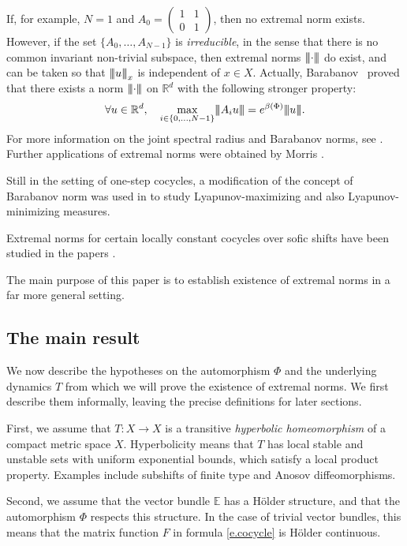 \documentclass[10pt]{amsart}
\theoremstyle{plain}
\theoremstyle{definition}
\newcommand{\tribar}[1]{\mathopen{| {\kern -1.5pt} | {\kern -1.5pt} |} {#1}
\mathclose{| {\kern -1.5pt} | {\kern -1.5pt} |}}
\newcommand{\RR}{\mathbb{R}}
\newcommand{\EE}{\mathbb{E}}
\begin{document}
If, for example, $N=1$ and $A_0 = \left( \begin{smallmatrix} 1 & 1 \\ 0 & 1 \end{smallmatrix} \right)$, then no extremal norm exists. However, if the set $\{A_0,\dots,A_{N-1}\}$ is \emph{irreducible}, in the sense that there is no common invariant non-trivial subspace, then extremal norms $\tribar{\cdot}$ do exist, and can be taken so that
$\tribar{u}_x$ is independent of $x \in X$.
Actually, Barabanov~\cite{Barabanov} proved that there exists a norm $\tribar{\cdot}$ on $\RR^d$ with the following stronger property:
\begin{equation}\label{e.Barabanov}
\forall u \in \RR^d, \quad
\max_{i \in \{0,\dots,N-1\}} \tribar{A_i u} = e^{\beta(\Phi)} \tribar{u}.
\end{equation}
For more information on the joint spectral radius and Barabanov norms, see \cite{Wirth,Jungers}.
Further applications of extremal norms were obtained by Morris \cite{Morris_rapidly,Morris_Mather}.

Still in the setting of one-step cocycles, a modification of the concept of Barabanov norm was used in \cite{BR,BM} to study Lyapunov-maximizing and also Lyapunov-minimizing measures.

Extremal norms for certain locally constant cocycles over sofic shifts have been studied in the papers \cite{PEDJ,CGP}.

The main purpose of this paper is to establish existence of extremal norms in a far more general setting.

\subsection{The main result}

We now describe the hypotheses on the automorphism $\Phi$ and the underlying dynamics $T$ from which we will prove the existence of extremal norms. We first describe them informally, leaving the precise definitions for later sections.

First, we assume that $T \colon X \to X$ is a transitive \emph{hyperbolic homeomorphism} of a compact metric space $X$. Hyperbolicity means that $T$ has local stable and unstable sets with uniform exponential bounds, which satisfy a local product property. Examples include subshifts of finite type and Anosov diffeomorphisms.

Second, we assume that the vector bundle $\EE$ has a Hölder structure, and that the automorphism $\Phi$ respects this structure. In the case of trivial vector bundles, this means that the matrix function $F$ in formula \eqref{e.cocycle} is Hölder continuous.
\end{document}
